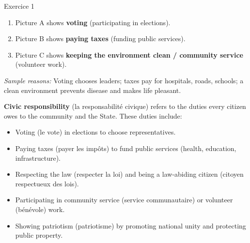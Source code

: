 \documentclass[11pt]{article}
\newcommand{\cle}[1]{{\popxbold\color{popdark}#1}}
\begin{document}
\begin{corrige}{Exercice 1}
\begin{enumerate}
\item Picture A shows \textbf{voting} (participating in elections).
\item Picture B shows \textbf{paying taxes} (funding public services).
\item Picture C shows \textbf{keeping the environment clean / community service} (volunteer work).
\end{enumerate}
\textit{Sample reasons:} Voting chooses leaders; taxes pay for hospitals, roads, schools; a clean environment prevents disease and makes life pleasant.
\end{corrige}

\begin{definition}
\textbf{Civic responsibility} (la responsabilité civique) refers to the duties every citizen owes to the community and the State. These duties include:
\begin{itemize}
\item \cle{Voting} (le vote) in elections to choose representatives.
\item \cle{Paying taxes} (payer les impôts) to fund public services (health, education, infrastructure).
\item \cle{Respecting the law} (respecter la loi) and being a \cle{law-abiding citizen} (citoyen respectueux des lois).
\item Participating in \cle{community service} (service communautaire) or \cle{volunteer} (bénévole) work.
\item Showing \cle{patriotism} (patriotisme) by promoting national unity and protecting public property.
\end{itemize}
\end{definition}
\end{document}
